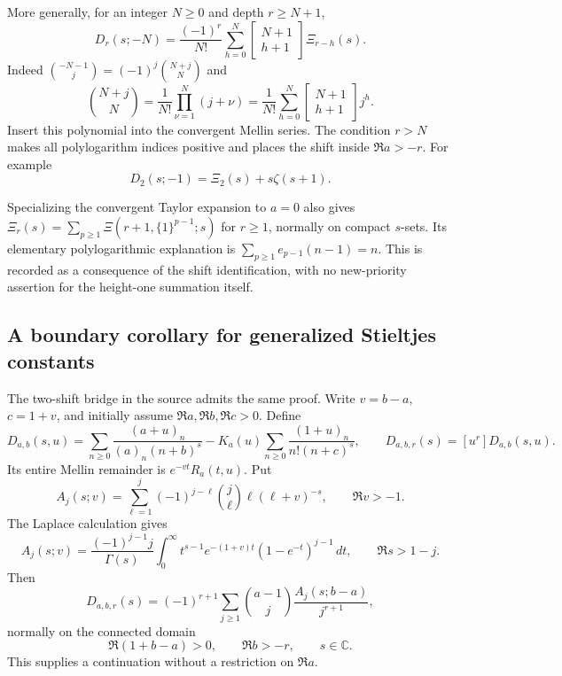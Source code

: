 More generally, for an integer $N\ge0$ and depth $r\ge N+1$,
\begin{equation}\label{hn:eq:negative-shifts}
 D_r(s;-N)=\frac{(-1)^r}{N!}\sum_{h=0}^N
     \left[\begin{matrix}N+1\\h+1\end{matrix}\right]\Xi_{r-h}(s).
\end{equation}
Indeed $\binom{-N-1}{j}=(-1)^j\binom{N+j}{N}$ and
\[
 \binom{N+j}{N}=\frac1{N!}\prod_{\nu=1}^N(j+\nu)
   =\frac1{N!}\sum_{h=0}^N
       \left[\begin{matrix}N+1\\h+1\end{matrix}\right]j^h.
\]
Insert this polynomial into the convergent Mellin series. The
condition $r>N$ makes all polylogarithm indices positive and
places the shift inside $\Re a>-r$. For example
\[
                   D_2(s;-1)=\Xi_2(s)+s\zeta(s+1).
\]

Specializing the convergent Taylor expansion to $a=0$ also gives
$\Xi_r(s)=\sum_{p\ge1}\Xi(r+1,\{1\}^{p-1};s)$ for $r\ge1$,
normally on compact $s$-sets. Its elementary polylogarithmic
explanation is $\sum_{p\ge1}e_{p-1}(n-1)=n$.
This is recorded as a consequence of the shift identification,
with no new-priority assertion for the height-one summation itself.

\subsection{A boundary corollary for generalized Stieltjes constants}

The two-shift bridge in the source admits the same proof. Write
$v=b-a$, $c=1+v$, and initially assume $\Re a,\Re b,\Re c>0$.
Define
\[
 D_{a,b}(s,u)=\sum_{n\ge0}\frac{(a+u)_n}{(a)_n(n+b)^s}
   -K_a(u)\sum_{n\ge0}\frac{(1+u)_n}{n!(n+c)^s},
 \qquad D_{a,b,r}(s)=[u^r]D_{a,b}(s,u).
\]
Its entire Mellin remainder is $e^{-vt}R_a(t,u)$.
Put
\[
 A_j(s;v)=\sum_{\ell=1}^j(-1)^{j-\ell}\binom j\ell
                     \ell(\ell+v)^{-s},\qquad \Re v>-1.
\]
The Laplace calculation gives
\[
 A_j(s;v)=\frac{(-1)^{j-1}j}{\Gamma(s)}
       \int_0^\infty t^{s-1}e^{-(1+v)t}(1-e^{-t})^{j-1}\,dt,
 \qquad \Re s>1-j.
\]
Then
\begin{equation}\label{hn:eq:twodepth}
 D_{a,b,r}(s)=(-1)^{r+1}\sum_{j\ge1}\binom{a-1}{j}
                           \frac{A_j(s;b-a)}{j^{r+1}},
\end{equation}
normally on the connected domain
\begin{equation}\label{hn:eq:two-domain}
              \Re(1+b-a)>0,\qquad \Re b>-r,\qquad s\in\mathbb C.
\end{equation}
This supplies a continuation without a restriction on $\Re a$.

